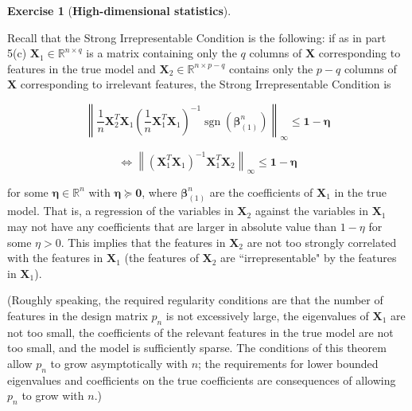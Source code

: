 \documentclass{article}
\theoremstyle{definition}
\newtheorem{exercise}{Exercise}
\theoremstyle{definition}
\theoremstyle{definition}
\theoremstyle{definition}
\begin{document}
\begin{exercise}[\textbf{High-dimensional statistics}]
\begin{enumerate}[(a)]
Recall that the Strong Irrepresentable Condition is the following: if as in part 5(c) \(\boldsymbol{X}_1 \in \mathbb{R}^{n \times q}\) is a matrix containing only the \(q\) columns of \(\boldsymbol{X}\) corresponding to features in the true model and \(\boldsymbol{X}_2 \in \mathbb{R}^{n \times p - q}\) contains only the \(p - q\) columns of \(\boldsymbol{X}\) corresponding to irrelevant features, the Strong Irrepresentable Condition is

\[
\left\lVert \frac{1}{n} \boldsymbol{X}_2^T \boldsymbol{X}_1 \left(\frac{1}{n} \boldsymbol{X}_1^T \boldsymbol{X}_1 \right)^{-1} \operatorname{sgn} \left(\boldsymbol{\beta}_{(1)}^n \right) \right\rVert_\infty \leq \boldsymbol{1} - \boldsymbol{\eta}
\]  

\[
\iff \left\lVert  \left( \boldsymbol{X}_1^T \boldsymbol{X}_1 \right)^{-1}  \boldsymbol{X}_1^T \boldsymbol{X}_2 \right\rVert_\infty \leq \boldsymbol{1} - \boldsymbol{\eta}
\]  

for some \(\boldsymbol{\eta} \in \mathbb{R}^n\) with \(\boldsymbol{\eta} \succeq \boldsymbol{0}\), where \(\boldsymbol{\beta}_{(1)}^n\) are the coefficients of \(\boldsymbol{X}_1\) in the true model. That is, a regression of the variables in \(\boldsymbol{X}_2\) against the variables in \(\boldsymbol{X}_1\) may not have any coefficients that are larger in absolute value than \(1 - \eta\) for some \(\eta > 0\). This implies that the features in \(\boldsymbol{X}_2\) are not too strongly correlated with the features in \(\boldsymbol{X}_1\) (the features of \(\boldsymbol{X}_2\) are ``irrepresentable" by the features in \(\boldsymbol{X}_1\)).


(Roughly speaking, the required regularity conditions are that the number of features in the design matrix \(p_n\) is not excessively large, the eigenvalues of \(\boldsymbol{X}_1\) are not too small, the coefficients of the relevant features in the true model are not too small, and the model is sufficiently sparse. The conditions of this theorem allow \(p_n\) to grow asymptotically with \(n\); the requirements for lower bounded eigenvalues and coefficients on the true coefficients are consequences of allowing \(p_n\) to grow with \(n\).)

\end{enumerate}

\end{exercise}



\end{document}
